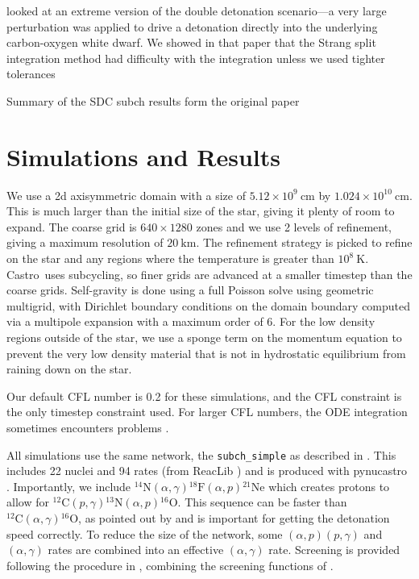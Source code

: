 \documentclass[linenumbers,trackchanges]{aastex631}
\newcommand{\isotm}[2]{{}^{#2}\mathrm{#1}}
\newcommand{\castro}{{\sf Castro}}
\newcommand{\pynucastro}{{\sf pynucastro}}
\newcommand{\MarginPar}[1]{
    \marginpar{\vskip-\baselineskip%
               \raggedright%
               \tiny\sffamily%
               {\color{red}\hrule%
               \smallskip%
               #1\par%
               \smallskip%
               \hrule}}%
}
\begin{document}
\citet{castro_simple_sdc} looked at an extreme version of the
double detonation scenario---a very large perturbation was applied
to drive a detonation directly into the underlying
carbon-oxygen white dwarf.  We showed in that paper that the Strang
split integration method had difficulty with the integration unless
we used tighter tolerances

Summary of the SDC subch results form the original paper

\section{Simulations and Results}\label{Sec:results}


We use a 2d axisymmetric domain with a size of $5.12\times 10^9~\mathrm{cm}$ by $1.024\times 10^{10}~\mathrm{cm}$.  This is
much larger than the initial size of the star, giving it plenty of
room to expand.  The coarse grid is $640\times 1280$ zones and we use
2 levels of refinement, giving a maximum resolution of
$20~\mathrm{km}$.  The refinement strategy is picked to refine on the
star and any regions where the temperature is greater than
$10^8~\mathrm{K}$.  \castro\ uses subcycling, so finer grids are
advanced at a smaller timestep than the coarse grids.  Self-gravity is
done using a full Poisson solve using geometric multigrid, with
Dirichlet boundary conditions on the domain boundary computed via a
multipole expansion with a maximum order of 6.  For the low density
regions outside of the star, we use a sponge term on the momentum
equation to prevent the very low density material that is not in
hydrostatic equilibrium from raining down on the star.

Our default CFL number is 0.2 for these simulations, and the CFL constraint
is the only timestep constraint used.  For larger CFL numbers, the ODE integration
sometimes encounters problems \MarginPar{more}.

All simulations use the same network, the {\tt subch\_simple} as
described in \cite{zhi2023}.  This includes 22 nuclei and 94 rates
(from ReacLib \citealt{reaclib}) and is produced with \pynucastro
\citep{pynucastro2}.  Importantly, we include
$\isotm{N}{14}(\alpha,\gamma)\isotm{F}{18}(\alpha,p)\isotm{Ne}{21}$
which creates protons to allow for
$\isotm{C}{12}(p,\gamma)\isotm{N}{13}(\alpha,p)\isotm{O}{16}$.  This
sequence can be faster than
$\isotm{C}{12}(\alpha,\gamma)\isotm{O}{16}$, as pointed out by
\citet{shenbildsten} and is important for getting the detonation speed
correctly.  To reduce the size of the network, some
$(\alpha,p)(p,\gamma)$ and $(\alpha,\gamma)$ rates are combined into
an effective $(\alpha,\gamma)$ rate.  Screening is provided following
the procedure in \citet{wallace:1982}, combining the screening
functions of \citet{graboske:1973,alastuey:1978,itoh:1979}.
\end{document}

